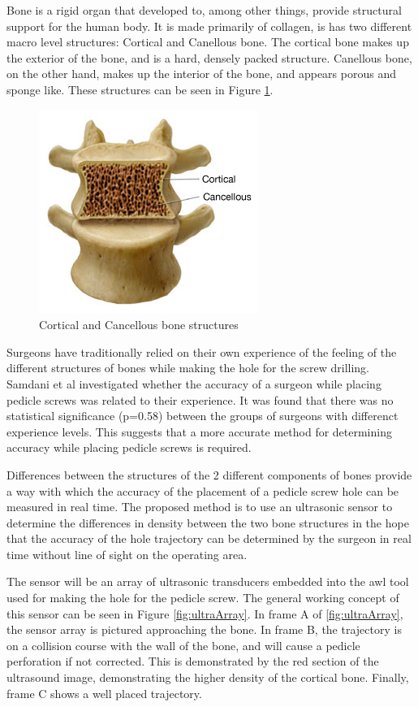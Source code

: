 \documentclass[conference, a4paper]{IEEEtran}
\begin{document}
Bone is a rigid organ that developed to, among other things, 
provide structural support for the human body. It is made primarily of
collagen, is has two different macro level structures: Cortical and Canellous 
bone. The cortical bone makes up the exterior of the bone, and is a hard, 
densely packed structure. Canellous bone, on the other hand, makes up the
interior of the bone, and appears porous and sponge like. These structures
can be seen in Figure \ref{fig:boneStruct}.

\begin{figure}
	\centering
	\includegraphics{assets/boneStruct.jpg}
	\caption{Cortical and Cancellous bone structures \cite{boneStructure}}
	\label{fig:boneStruct}
\end{figure}

Surgeons have traditionally relied on their own
experience of the feeling of the different structures of bones while
making the hole for the screw drilling. Samdani et al \cite{Samdani2010}
investigated whether the accuracy of a surgeon while placing pedicle screws
was related to their experience. It was found that there was no statistical
significance (p=0.58) between the groups of surgeons with differenct 
experience levels. This suggests that a more accurate method for determining
accuracy while placing pedicle screws is required.

Differences between the structures of the 2 different components of bones
provide a way with which the accuracy of the placement of a pedicle screw hole
can be measured in real time. The proposed method is to use an ultrasonic 
sensor to determine the differences in density between the two bone structures
in the hope that the accuracy of the hole trajectory can be determined by the
surgeon in real time without line of sight on the operating area. 

The sensor will be an array of ultrasonic transducers embedded into the awl
tool used for making the hole for the pedicle screw. The general working
concept of this sensor can be seen in Figure \ref{fig:ultraArray}.
In frame A of \ref{fig:ultraArray}, the sensor array is pictured approaching
the bone. In frame B, the trajectory is on a collision course with the wall 
of the bone, and will cause a pedicle perforation if not corrected. This
is demonstrated by the red section of the ultrasound image, demonstrating 
the higher density of the cortical bone. Finally, frame C shows a well placed
trajectory.
\end{document}
